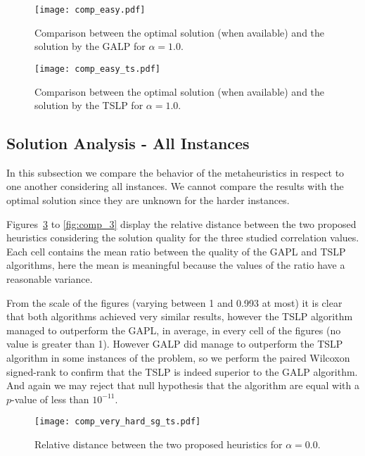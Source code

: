 \begin{figure}
\centering
\texttt{[image: comp\_easy.pdf]}
\caption{Comparison between the optimal solution (when available) 
and the solution by the GALP for $\alpha=1.0$.}
\label{fig:mh1_3}
\end{figure}

\begin{figure}
\centering
\texttt{[image: comp\_easy\_ts.pdf]}
\caption{Comparison between the optimal solution (when available) 
and the solution by the TSLP for $\alpha=1.0$.}
\label{fig:mh2_3}
\end{figure}


\subsection{Solution Analysis - All Instances}

In this subsection we compare the behavior of the metaheuristics in respect to one another
considering all instances. We cannot compare the results with the optimal solution since they are unknown for the harder instances.

Figures~\ref{fig:comp_1} to \ref{fig:comp_3} display the relative distance between the two proposed 
heuristics considering the solution quality for the three studied correlation values.
Each cell contains the mean ratio between the quality of the GAPL and TSLP algorithms,
here the mean is meaningful because the values of the ratio have a reasonable variance.

From the scale of the figures (varying between 1 and 0.993 at most) it is clear
that both algorithms achieved very similar results, however the TSLP algorithm
managed to outperform the GAPL, in average, in every cell of the figures (no value is greater than 1).
However GALP did manage to outperform the TSLP algorithm in some instances of the problem,
so we perform the paired Wilcoxon signed-rank to confirm that the TSLP is indeed superior
to the GALP algorithm. And again we may reject that null hypothesis that the algorithm
are equal with a $p$-value of less than $10^{-11}$.

\begin{figure}
\centering
\texttt{[image: comp\_very\_hard\_sg\_ts.pdf]}
\caption{Relative distance between the two proposed heuristics for $\alpha=0.0$.}
\label{fig:comp_1}
\end{figure}



